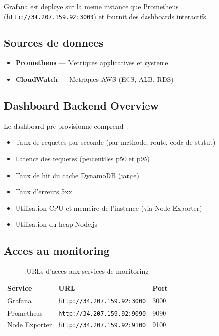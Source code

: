 Grafana est deploye sur la meme instance que Prometheus
(\texttt{http://34.207.159.92:3000}) et fournit des dashboards interactifs.

\subsection{Sources de donnees}

\begin{itemize}
    \item \textbf{Prometheus} --- Metriques applicatives et systeme
    \item \textbf{CloudWatch} --- Metriques AWS (ECS, ALB, RDS)
\end{itemize}

\subsection{Dashboard Backend Overview}

Le dashboard pre-provisionne comprend~:
\begin{itemize}
    \item Taux de requetes par seconde (par methode, route, code de statut)
    \item Latence des requetes (percentiles p50 et p95)
    \item Taux de hit du cache DynamoDB (jauge)
    \item Taux d'erreurs 5xx
    \item Utilisation CPU et memoire de l'instance (via Node Exporter)
    \item Utilisation du heap Node.js
\end{itemize}

\subsection{Acces au monitoring}

\begin{table}[H]
    \centering
    \begin{tabular}{lll}
        \toprule
        \textbf{Service} & \textbf{URL} & \textbf{Port} \\
        \midrule
        Grafana & \texttt{http://34.207.159.92:3000} & 3000 \\
        Prometheus & \texttt{http://34.207.159.92:9090} & 9090 \\
        Node Exporter & \texttt{http://34.207.159.92:9100} & 9100 \\
        \bottomrule
    \end{tabular}
    \caption{URLs d'acces aux services de monitoring}
\end{table}


